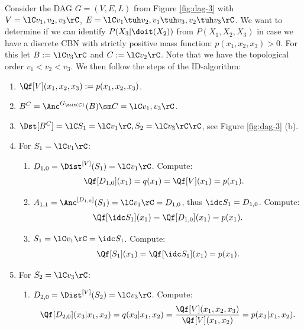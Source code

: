 \begin{Eg}
   Consider the DAG $G=(V,E,L)$ from Figure \ref{fig:dag-3} with $V=\lC v_1,v_2,v_3 \rC$, 
    $E=\lC v_1 \tuh v_2, v_1 \tuh v_3, v_2 \tuh v_3  \rC$.
     We want to determine if we can identify $P(X_3|\doit(X_2))$ from $P(X_1,X_2,X_3)$ in case we have a discrete CBN with strictly positive mass function: $p(x_1,x_2,x_3) >0$.  
     For this let $B:=\lC v_3 \rC$ and $C:=\lC v_2 \rC$. Note that we have the topological order $v_1 < v_2 < v_3$.
    We then follow the steps of the ID-algorithm:
        \begin{enumerate}
        \item $\Qf[V](x_1,x_2,x_3) := p(x_1,x_2,x_3)$.
        \item $B^C = \Anc^{G_{\doit(C)}}(B) \sm C = \lC v_1,v_3 \rC$.
        \item $\Dst[B^C] =\lC S_1=\lC v_1 \rC, S_2=\lC v_3 \rC   \rC$, see Figure \ref{fig:dag-3} (b).
        \item For $S_1=\lC v_1 \rC$:
            \begin{enumerate}
                \item $D_{1,0} = \Dist^{[V]}(S_1) = \lC v_1\rC$. Compute:
                    \begin{align*}
                        \Qf[D_{1,0}](x_1) &= q(x_1) = \Qf[V](x_1)= p(x_1).
                    \end{align*}
                \item $A_{1,1} = \Anc^{[D_{1,0}]}(S_1) = \lC v_1\rC = D_{1,0}$, thus $\idc S_1 =D_{1,0}$. Compute:
                    \begin{align*}
                        \Qf[\idc S_1](x_1) =    \Qf[D_{1,0}](x_1)   = p(x_1).
                    \end{align*}
                \item $ S_1 = \lC v_1 \rC = \idc S_1$. Compute:
                    \begin{align*}
                       \Qf[S_1](x_1) =    \Qf[\idc S_1](x_1) =  p(x_1).
                    \end{align*}
            \end{enumerate}
       \item For $S_2=\lC v_3 \rC$:
            \begin{enumerate}
                \item $D_{2,0} = \Dist^{[V]}(S_2) = \lC v_3 \rC$. Compute:
                    \begin{align*}
                \Qf[D_{2,0}](x_3|x_1,x_2) =  q(x_3|x_1,x_2)  = \frac{\Qf[V](x_1,x_2,x_3)}{\Qf[V](x_1,x_2)}  = p(x_3|x_1,x_2).

\end{align*}
\end{enumerate}
\end{enumerate}
\end{Eg}
